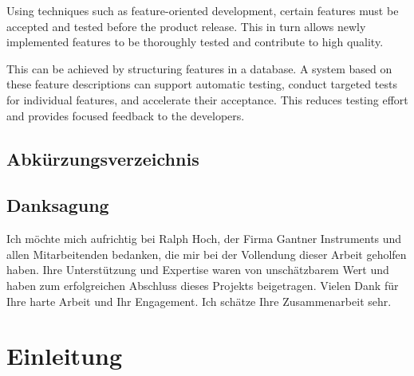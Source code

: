 \documentclass[a4paper, fontsize=11pt, parskip=half, twoside]{scrreprt}
\begin{document}
	Using techniques such as feature-oriented development, certain features must be accepted and tested before the product release. 
	This in turn allows newly implemented features to be thoroughly tested and contribute to high quality. 
	
	This can be achieved by structuring features in a database. 
	A system based on these feature descriptions can support automatic testing, conduct targeted tests for individual features, and accelerate their acceptance. 
	This reduces testing effort and provides focused feedback to the developers.
	
	\cleardoublepage   %
	\setcounter{tocdepth}{2}
	\setcounter{secnumdepth}{4}
	\tableofcontents
	
	\clearpage
	\listoffigures
	
	\clearpage
	\section*{Abkürzungsverzeichnis}
	\begin{acronym}
	
	\end{acronym}
	
	\clearpage
	\section*{Danksagung}
	Ich möchte mich aufrichtig bei Ralph Hoch, der Firma Gantner Instruments und allen Mitarbeitenden bedanken, die mir bei der Vollendung dieser Arbeit geholfen haben. 
	Ihre Unterstützung und Expertise waren von unschätzbarem Wert und haben zum erfolgreichen Abschluss dieses Projekts beigetragen. 
	Vielen Dank für Ihre harte Arbeit und Ihr Engagement. 
	Ich schätze Ihre Zusammenarbeit sehr.
	
	
	
	\clearpage
	\chapter{Einleitung}
	
\end{document}
